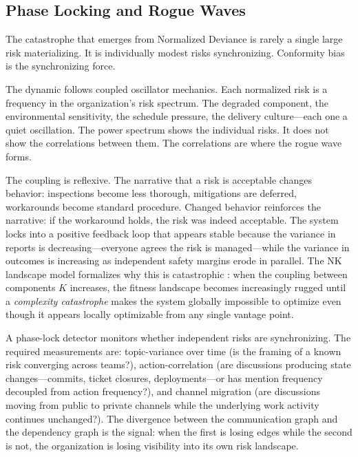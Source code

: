 \documentclass[11pt,a4paper]{article}
\begin{document}
\subsection{Phase Locking and Rogue Waves}
\label{sec:phase-lock}

The catastrophe that emerges from Normalized Deviance is rarely a single large risk materializing. It is individually modest risks synchronizing. Conformity bias is the synchronizing force.

The dynamic follows coupled oscillator mechanics. Each normalized risk is a frequency in the organization's risk spectrum. The degraded component, the environmental sensitivity, the schedule pressure, the delivery culture---each one a quiet oscillation. The power spectrum shows the individual risks. It does not show the correlations between them. The correlations are where the rogue wave forms.

The coupling is reflexive. The narrative that a risk is acceptable changes behavior: inspections become less thorough, mitigations are deferred, workarounds become standard procedure. Changed behavior reinforces the narrative: if the workaround holds, the risk was indeed acceptable. The system locks into a positive feedback loop that appears stable because the variance in reports is decreasing---everyone agrees the risk is managed---while the variance in outcomes is increasing as independent safety margins erode in parallel. The NK landscape model formalizes why this is catastrophic \citep{kauffman1993}: when the coupling between components $K$ increases, the fitness landscape becomes increasingly rugged until a \emph{complexity catastrophe} makes the system globally impossible to optimize even though it appears locally optimizable from any single vantage point.

A phase-lock detector monitors whether independent risks are synchronizing. The required measurements are: topic-variance over time (is the framing of a known risk converging across teams?), action-correlation (are discussions producing state changes---commits, ticket closures, deployments---or has mention frequency decoupled from action frequency?), and channel migration (are discussions moving from public to private channels while the underlying work activity continues unchanged?). The divergence between the communication graph and the dependency graph is the signal: when the first is losing edges while the second is not, the organization is losing visibility into its own risk landscape.
\end{document}
